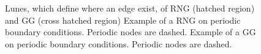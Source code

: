     \begin{figure}[htbp]
        \centering
        \caption[Gabriel - and Relative Neighborhood Graph]
        {
             Lunes, which define where an edge
                exist, of RNG (hatched region) and GG (cross hatched region)
             Example of a RNG on periodic
                boundary conditions. Periodic nodes are dashed.
             Example of a GG on
                periodic boundary conditions. Periodic nodes are dashed.
        }
        \label{fig:lunes}
    \end{figure}

